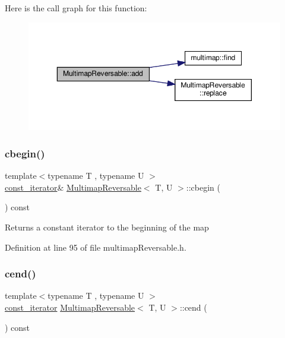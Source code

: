 Here is the call graph for this function\+:
\nopagebreak
\begin{figure}[H]
\begin{center}
\leavevmode
\includegraphics[width=350pt]{classMultimapReversable_a6e6c514a5fcd3df9fa0c068075064735_cgraph}
\end{center}
\end{figure}
\mbox{\label{classMultimapReversable_a20b261236b6075cd93e16ab0ec0455c4}} 
\subsubsection{\texorpdfstring{cbegin()}{cbegin()}}
{\footnotesize\ttfamily template$<$typename T , typename U $>$ \\
\hyperlink{classMultimapReversable_ac747a36aa9a030bec3d2149d97047de5}{const\+\_\+iterator}\& \hyperlink{classMultimapReversable}{Multimap\+Reversable}$<$ T, U $>$\+::cbegin (\begin{DoxyParamCaption}{ }\end{DoxyParamCaption}) const\hspace{0.3cm}{\ttfamily [inline]}}

\begin{DoxyReturn}{Returns}
a constant iterator to the beginning of the map 
\end{DoxyReturn}


Definition at line 95 of file multimap\+Reversable.\+h.

\mbox{\label{classMultimapReversable_a61a87bb3d33488b80d46fbbeffa2b91e}} 
\subsubsection{\texorpdfstring{cend()}{cend()}}
{\footnotesize\ttfamily template$<$typename T , typename U $>$ \\
\hyperlink{classMultimapReversable_ac747a36aa9a030bec3d2149d97047de5}{const\+\_\+iterator} \hyperlink{classMultimapReversable}{Multimap\+Reversable}$<$ T, U $>$\+::cend (\begin{DoxyParamCaption}{ }\end{DoxyParamCaption}) const\hspace{0.3cm}{\ttfamily [inline]}}

